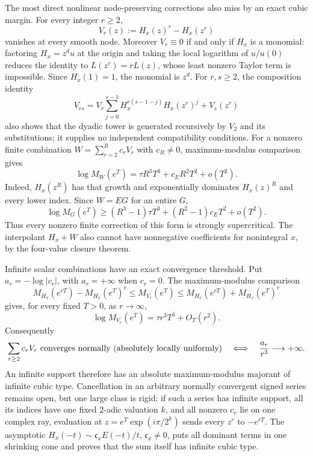 \documentclass[11pt,oneside]{article}
\theoremstyle{definition}
\theoremstyle{remark}
\begin{document}
The most direct nonlinear node-preserving corrections also miss by an exact cubic margin.
For every integer $r\ge2$,
\begin{equation}
 V_r(z):=H_x(z)^r-H_x(z^r)
 \label{crit:eq-nonlinear-node-defect}
\end{equation}
vanishes at every smooth node.  Moreover $V_r\equiv0$ if and only if $H_x$ is a monomial:
factoring $H_x=z^du$ at the origin and taking the local logarithm of $u/u(0)$ reduces the
identity to $L(z^r)=rL(z)$, whose least nonzero Taylor term is impossible.  Since
$H_x(1)=1$, the monomial is $z^d$.  For $r,s\ge2$, the composition identity
\[
 V_{rs}=V_r\sum_{j=0}^{s-1}H_x^{r(s-1-j)}H_x(z^r)^j+V_s(z^r)
\]
also shows that the dyadic tower is generated recursively by $V_2$ and its substitutions;
it supplies no independent compatibility conditions.  For a nonzero finite combination
$W=\sum_{r=2}^Rc_rV_r$ with $c_R\ne0$, maximum-modulus comparison gives
\begin{equation}
 \log M_W(e^T)=\tau R^3T^3+c_ER^2T^2+o(T^2).
 \label{crit:eq-nonlinear-node-defect-growth}
\end{equation}
Indeed, $H_x(z^R)$ has that growth and exponentially dominates $H_x(z)^R$ and every lower
index.  Since $W=EG$ for an entire $G$,
\[
 \log M_G(e^T)\ge (R^3-1)\tau T^3+(R^2-1)c_ET^2+o(T^2).
\]
Thus every nonzero finite correction of this form is strongly supercritical.  The
interpolant $H_x+W$ also cannot have nonnegative coefficients for nonintegral $x$, by the
four-value closure theorem.

Infinite scalar combinations have an exact convergence threshold.  Put
$a_r=-\log|c_r|$, with $a_r=+\infty$ when $c_r=0$.  The maximum-modulus comparison
\[
 M_{H_x}(e^{rT})-M_{H_x}(e^T)^r
 \le M_{V_r}(e^T)
 \le M_{H_x}(e^{rT})+M_{H_x}(e^T)^r
\]
gives, for every fixed $T>0$, as $r\to\infty$,
\[
 \log M_{V_r}(e^T)=\tau r^3T^3+O_T(r^2).
\]
Consequently
\begin{equation}
 \sum_{r\ge2}c_rV_r\ \hbox{converges normally (absolutely locally uniformly)}
 \quad\Longleftrightarrow\quad
 \frac{a_r}{r^3}\longrightarrow+\infty.
 \label{crit:eq-nonlinear-normal-series}
\end{equation}
An infinite support therefore has an absolute maximum-modulus majorant of infinite cubic
type.  Cancellation in an arbitrary normally convergent signed series remains open, but one
large class is rigid: if such a series has infinite support, all its indices have one fixed
$2$-adic valuation $k$, and all nonzero $c_r$ lie on one complex ray, evaluation at
$z=e^T\exp(i\pi/2^k)$ sends every $z^r$ to $-e^{rT}$.
The asymptotic $H_x(-t)\sim\mathfrak c_xE(-t)/t$, $\mathfrak c_x\ne0$, puts all dominant terms in
one shrinking cone and proves that the sum itself has infinite cubic type.
\end{document}
